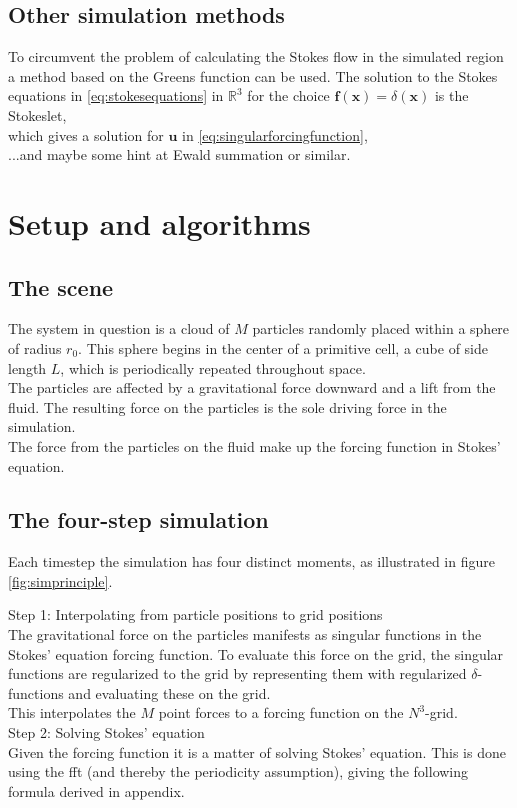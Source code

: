 \documentclass[a4paper,
twoside=false,abstract=false,numbers=noenddot,
titlepage=false,headings=small,parskip=half,version=last]{scrartcl}
\begin{document}
\subsection{Other simulation methods}
To circumvent the problem of calculating the Stokes flow in the simulated region a method based on the Greens function can be used.
The solution to the Stokes equations in \eqref{eq:stokesequations} in $\mathbb{R}^3$ for the choice $\mathbf{f}(\mathbf{x}) = \delta(\mathbf{x})$ is the Stokeslet,
\begin{equation}
[Stokeslet]
\end{equation}
which gives a solution for $\mathbf{u}$ in \eqref{eq:singularforcingfunction},
\begin{equation}
[Solutionsum]
\end{equation}
...and maybe some hint at Ewald summation or similar.

\section{Setup and algorithms}

\subsection{The scene}
The system in question is a cloud of $M$ particles randomly placed within a sphere of radius $r_0$. This sphere begins in the center of a primitive cell, a cube of side length $L$, which is periodically repeated throughout space.\\
The particles are affected by a gravitational force downward and a lift from the fluid. The resulting force on the particles is the sole driving force in the simulation.\\
The force from the particles on the fluid make up the forcing function in Stokes' equation.

\subsection{The four-step simulation}
Each timestep the simulation has four distinct moments, as illustrated in figure \ref{fig:simprinciple}.

Step 1: Interpolating from particle positions to grid positions\\
The gravitational force on the particles manifests as singular functions in the Stokes' equation forcing function. To evaluate this force on the grid, the singular functions are regularized to the grid by representing them with regularized $\delta$-functions and evaluating these on the grid.\\ This interpolates the $M$ point forces to a forcing function on the $N^3$-grid.\\
Step 2: Solving Stokes' equation\\
Given the forcing function it is a matter of solving Stokes' equation. This is done using the fft (and thereby the periodicity assumption), giving the following formula derived in appendix.
\end{document}
